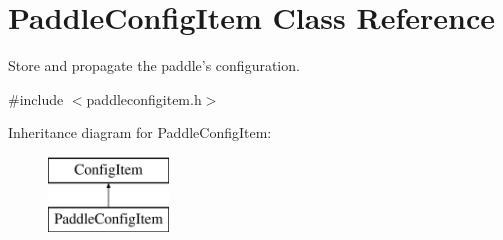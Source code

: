 \hypertarget{classPaddleConfigItem}{\section{Paddle\-Config\-Item Class Reference}
\label{classPaddleConfigItem}
}


Store and propagate the paddle's configuration.  




{\ttfamily \#include $<$paddleconfigitem.\-h$>$}

Inheritance diagram for Paddle\-Config\-Item\-:\begin{figure}[H]
\begin{center}
\leavevmode
\includegraphics[height=2.000000cm]{classPaddleConfigItem}
\end{center}
\end{figure}
